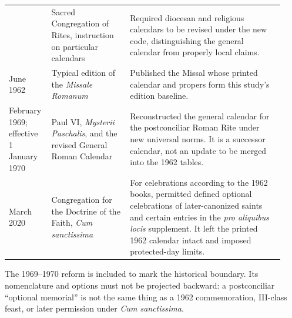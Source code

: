 \begin{longtable}{@{}>{\RaggedRight\arraybackslash}p{0.13\linewidth}>{\RaggedRight\arraybackslash}p{0.27\linewidth}>{\RaggedRight\arraybackslash}p{0.53\linewidth}@{}}
1961 & Sacred Congregation of Rites, instruction on particular calendars & Required diocesan and religious calendars to be revised under the new code, distinguishing the general calendar from properly local claims.\\
23 June 1962 & Typical edition of the \emph{Missale Romanum} & Published the Missal whose printed calendar and propers form this study's edition baseline.\\
14 February 1969; effective 1 January 1970 & Paul VI, \emph{Mysterii Paschalis}, and the revised General Roman Calendar & Reconstructed the general calendar for the postconciliar Roman Rite under new universal norms. It is a successor calendar, not an update to be merged into the 1962 tables.\\
19 March 2020 & Congregation for the Doctrine of the Faith, \emph{Cum sanctissima} & For celebrations according to the 1962 books, permitted defined optional celebrations of later-canonized saints and certain entries in the \emph{pro aliquibus locis} supplement. It left the printed 1962 calendar intact and imposed protected-day limits.\\
\end{longtable}

The 1969--1970 reform is included to mark the historical boundary. Its nomenclature and options must not be projected backward: a postconciliar ``optional memorial'' is not the same thing as a 1962 commemoration, III-class feast, or later permission under \emph{Cum sanctissima}.
